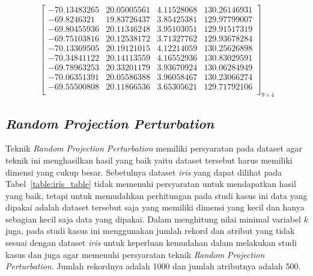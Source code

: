 \begin{enumerate}
    \[
        \begin{bmatrix}
        -70.13483265  &  20.05005561  &   4.11528068  & 130.26146931 \\
        -69.8246321   &  19.83726437  &   3.85425381 &  129.97799007 \\
        -69.80455936  &  20.11346248  &   3.95103051 &  129.91517319 \\
        -69.75103816  &  20.12538172  &   3.71327762 &  129.93678284 \\
        -70.13369505  &  20.19121015  &   4.12214059 &  130.25626898 \\
        -70.34841122  &  20.14113559  &   4.16552936  & 130.83029591 \\
        -69.78963253 &   20.33201179  &   3.93670924 &  130.06284949 \\
        -70.06351391 &   20.05586388   &  3.96058467 &  130.23066274 \\
        -69.55500808  &  20.11866536  &   3.65305621  & 129.71792106 \\
        \end{bmatrix}_{9\times 4}
    \]
\end{enumerate} 

\subsection{\textit{Random Projection Perturbation}}
\label{subsec:studi-rpp}

Teknik \textit{Random Projection Perturbation} memiliki persyaratan pada dataset agar teknik ini menghasilkan hasil yang baik yaitu dataset tersebut harus memiliki dimensi yang cukup besar. Sebetulnya dataset \textit{iris} yang dapat dilihat pada Tabel~\ref{table:iris_table} tidak memenuhi persyaratan untuk mendapatkan hasil yang baik, tetapi untuk memudahkan perhitungan pada studi kasus ini data yang dipakai adalah dataset tersebut saja yang memiliki dimensi yang kecil dan hanya sebagian kecil saja data yang dipakai. Dalam menghitung nilai minimal variabel \(k\) juga, pada studi kasus ini menggunakan jumlah rekord dan atribut yang tidak sesuai dengan dataset \textit{iris} untuk keperluan kemudahan dalam melakukan studi kasus dan juga agar memenuhi persyaratan teknik \textit{Random Projection Perturbation}. Jumlah rekordnya adalah 1000 dan jumlah atributnya adalah 500.

